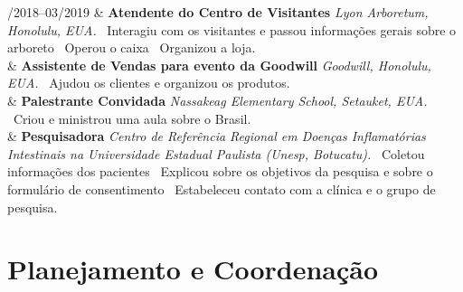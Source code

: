 \documentclass[11pt, a4paper]{article}
\newcommand{\Duration}[2]{\fontsize{10pt}{0}\selectfont #1--#2}
\newcommand{\Year}[1]{\fontsize{10pt}{0}\selectfont #1}
\begin{document}
\begin{EntriesTable}
	\Duration{08/2018}{03/2019}  &
	\textbf{Atendente do Centro de Visitantes}
	\newline
	\textit{Lyon Arboretum, Honolulu, EUA.}
	\newline
	\textbullet \ Interagiu com os visitantes e passou informações gerais 
	sobre o arboreto
	\textbullet \ Operou o caixa
	\textbullet \ Organizou a loja.
	\\
	\Year{2018}  &
	\textbf{Assistente de Vendas para evento da Goodwill}
	\newline
	\textit{Goodwill, Honolulu, EUA.}
	\newline
	\textbullet \ Ajudou os clientes e organizou os produtos.
		\\
	\Year{2017}  &
	\textbf{Palestrante Convidada}
	\newline
	\textit{Nassakeag Elementary School, Setauket, EUA.}
	\newline
	\textbullet \ Criou e ministrou uma aula sobre o Brasil.
	\\
	\Year{2009}  &
	\textbf{Pesquisadora}
	\newline
	\textit{Centro de Referência Regional em Doenças Inflamatórias 
	Intestinais na Universidade Estadual Paulista (Unesp, Botucatu).}
	\newline
	\textbullet \ Coletou informações dos pacientes
	\textbullet \ Explicou sobre os objetivos da pesquisa e sobre
	o formulário de consentimento
	\textbullet \ Estabeleceu contato com a clínica e o grupo de pesquisa.
	\\

\end{EntriesTable}


\section*{Planejamento e Coordenação}
\end{document}
